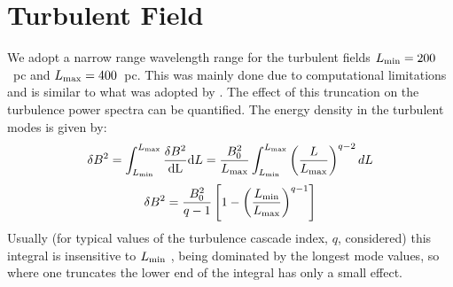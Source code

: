\documentclass[usenatbib]{mnras}
\begin{document}
\section{Turbulent Field}

\label{Appendix_D}
We adopt a narrow range wavelength range for the turbulent fields $L_{\rm min}=200$~pc and $L_{\rm max}=400$~pc. This was mainly done due to computational limitations and is similar to what was adopted by \citep{West_Helicity}. The effect of this truncation on the turbulence power spectra can be quantified. The energy density in the turbulent modes is given by:
\begin{equation}
    \delta B^{2} = \int _{L_{\rm min}}^{L_{\rm max}} \frac{\delta B^{2}}{\rm{d}L}{\rm{d}}L = \frac{B_{0}^{2}}{L_{\rm max}}\int  _{L_{\rm min}}^{L_{\rm max}}\left(\frac{L}{L_{\rm max}}\right)^{q-2} dL
\end{equation}
\begin{equation}
  \delta B^{2}  =\frac{B_{0}^{2}}{q-1}\left[1-\left(\frac{L_{\rm min}}{L_{\rm max}}\right)^{q-1}\right] 
\end{equation}
Usually (for typical values of the turbulence cascade index, $q$,
considered) this integral is insensitive to $L_{\rm min}$ , being dominated by the longest mode values, so where one truncates the lower end of the integral has only a small effect.
\end{document}
